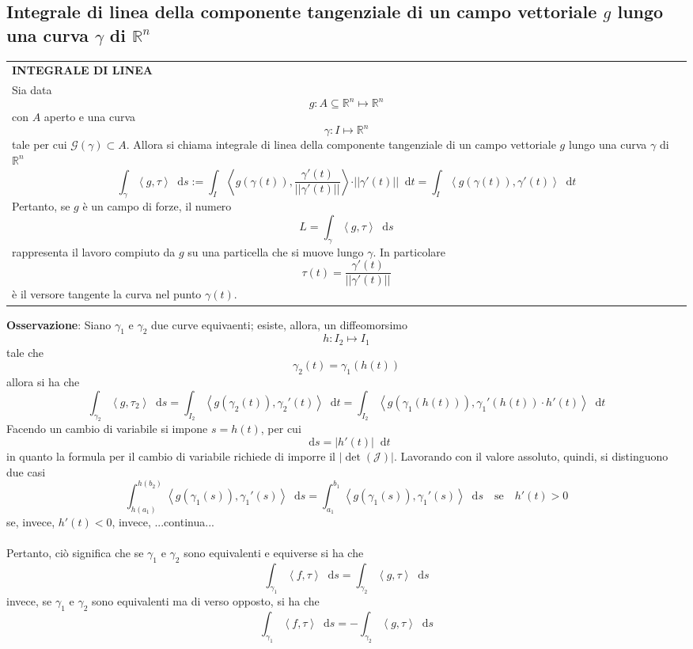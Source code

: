 \documentclass[a4paper]{extarticle}
\renewcommand\arraystretch{}
\newcommand*\dif{\mathop{}\!\mathrm{d}}
\begin{document}
\subsection{Integrale di linea della componente tangenziale di un campo vettoriale $g$ lungo una curva $\gamma$ di $\mathbb{R}^n$}

\vspace{1em}
\setlength{\tabcolsep}{14pt}
\renewcommand{\arraystretch}{2}
\noindent
\begin{tabularx}{\textwidth}{@{}|P|@{}}
    \hline
    {\textbf{INTEGRALE DI LINEA}}\\
    \parbox{\linewidth}{Sia data
    \[g : A \subseteq \mathbb{R}^n \longmapsto \mathbb{R}^n\]
    con $A$ aperto e una curva
    \[\gamma : I \longmapsto \mathbb{R}^n\]
    tale per cui $\mathcal{G}(\gamma) \subset A$. Allora si chiama integrale di linea della componente tangenziale di un campo vettoriale $g$ lungo una curva $\gamma$ di $\mathbb{R}^n$
    \[\int_\gamma \left<g,\tau\right> \dif s := \int_I \left<g(\gamma(t)), \dfrac{\gamma'(t)}{\vert\vert\gamma'(t)\vert\vert}\right> \cdot \vert \vert \gamma'(t) \vert \vert \dif t = \int_I \left<g(\gamma(t)),\gamma'(t)\right> \dif t\]
    Pertanto, se $g$ è un campo di forze, il numero
    \[L=\int_\gamma \left<g,\tau\right> \dif s\]
    rappresenta il lavoro compiuto da $g$ su una particella che si muove lungo $\gamma$. In particolare
    \[\tau(t) = \dfrac{\gamma'(t)}{\vert \vert \gamma'(t) \vert \vert}\]
    è il versore tangente la curva nel punto $\gamma(t)$.
    \vspace{3mm}}\\
    \hline
\end{tabularx}

\vspace{2em}
\noindent
\textbf{Osservazione}: Siano $\gamma_1$ e $\gamma_2$ due curve equivaenti; esiste, allora, un diffeomorsimo
\[h : I_2 \longmapsto I_1\]
tale che
\[\gamma_2(t) = \gamma_1(h(t))\]
allora si ha che
\[\int_{\gamma_2} \left<g,\tau_2\right> \dif s = \int_{I_2} \left<g(\gamma_2(t)), \gamma_2'(t)\right> \dif t = \int_{I_2} \left<g(\gamma_1(h(t))), \gamma_1'(h(t)) \cdot h'(t)\right> \dif t\]
Facendo un cambio di variabile si impone $s=h(t)$, per cui
\[\dif s = \vert h'(t)\vert \dif t\]
in quanto la formula per il cambio di variabile richiede di imporre il $\vert \det(\mathcal{J})\vert$. Lavorando con il valore assoluto, quindi, si distinguono due casi
\[\int_{h(a_1)}^{h(b_2)} \left<g(\gamma_1(s)), \gamma_1'(s)\right> \dif s = \int_{a_1}^{b_1} \left<g(\gamma_1(s)),\gamma_1'(s)\right>\dif s \hspace{1em} \text{se} \hspace{1em} h'(t) > 0\]
se, invece, $h'(t) < 0$, invece, ...continua...\\\\
Pertanto, ciò significa che se $\gamma_1$ e $\gamma_2$ sono equivalenti e equiverse si ha che
\[\int_{\gamma_1} \left<f,\tau\right> \dif s = \int_{\gamma_2} \left<g,\tau\right> \dif s\]
invece, se $\gamma_1$ e $\gamma_2$ sono equivalenti ma di verso opposto, si ha che
\[\int_{\gamma_1} \left<f,\tau\right> \dif s = -\int_{\gamma_2} \left<g,\tau\right> \dif s\]
\end{document}
